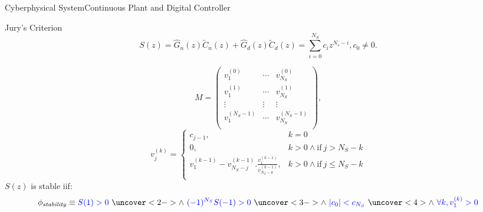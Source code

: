 \documentclass{beamer}
\begin{document}
\begin{frame}[fragile]{Cyberphysical System}{Continuous Plant and Digital Controller}




\end{frame}

\begin{frame}{Jury's Criterion}
\begin{equation*}
S(z) = \hat{G}_n(z) \tilde{C}_n(z)+\hat{G}_d(z) \tilde{C}_d(z) = \sum_{i=0}^{N_S} c_iz^{N_s-i}, c_0\neq0. 
\end{equation*}

$$
M=\left( 
\begin{array}{ccc}
v^{(0)}_{1} &\cdots & v^{(0)}_{N_S}\\
v^{(1)}_{1} &\cdots&  v^{(1)}_{N_S}\\
\vdots&\vdots&\vdots\\
v^{(N_S-1)}_{1} &\cdots&  v^{(N_S-1)}_{N_S}\\
\end{array}
\right), $$
%
$$
v_{j}^{(k)}=\left\{
\begin{array}{ll}
c_{j-1}, & k=0\\
0,&k>0 \wedge \mbox{if}~j>N_S-k\\
v_{1}^{(k-1)}-v_{N_S-j}^{(k-1)} . \frac{v_{1}^{(k-1)}}{v_{N_S-k}^{(k-1)}}, &k>0 \wedge  \mbox{if}~j\leq N_S-k\\
\end{array}
\right.
$$
%
$S(z)$ is stable iif:
$$\phi_\mathit{stability} \equiv \textcolor{blue}{S(1) > 0}\ \uncover<2->{\wedge\ \textcolor{blue}{(-1)^{N_S} S(-1) > 0}}\ \uncover<3->{\wedge\ \textcolor{blue}{|c_0| < c_{N_S}}}\ \uncover<4>{\wedge\ \textcolor{blue}{\forall k, v_1^{(k)} > 0}}$$
\end{frame}
\end{document}

